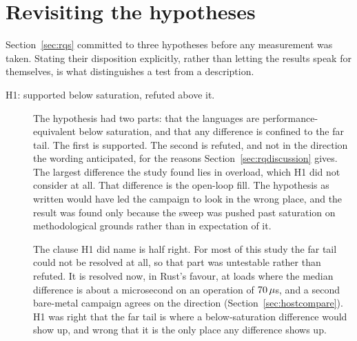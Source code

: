 \documentclass[english,oneside,a4paper,censored,csm,software-track-2020]{HYthesisML}
\begin{document}
\section{Revisiting the hypotheses}\label{sec:hypotheses}
Section~\ref{sec:rqs} committed to three hypotheses before any measurement was
taken. Stating their disposition explicitly, rather than letting the results speak for
themselves, is what distinguishes a test from a description.

\begin{description}
  \item[H1: supported below saturation, refuted above it.]
        The hypothesis had two parts: that the languages are performance-equivalent below
        saturation, and that any difference is confined to the far tail. The first is
        supported. The second is refuted, and not in the direction the wording anticipated,
        for the reasons Section~\ref{sec:rqdiscussion} gives. The largest difference the study
        found lies in overload, which H1 did not consider at all. That difference is the open-loop fill. The hypothesis as written would
        have led the campaign to look in the wrong place, and the result was found only because the
        sweep was pushed past saturation on methodological grounds rather than in expectation of it.

        The clause H1 did name is half right. For most of this study the far tail could not be
        resolved at all, so that part was untestable rather than refuted. It is resolved now, in
        Rust's favour, at loads where the median difference is about a microsecond on an
        operation of $70\,\mu$s, and a second bare-metal campaign agrees on the
        direction (Section~\ref{sec:hostcompare}). H1 was right that the far tail is where a
        below-saturation difference would show up, and wrong that it is the only place any
        difference shows up.


\end{description}
\end{document}
